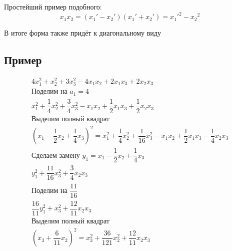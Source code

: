 \documentclass[12pt]{article}
\begin{document}
Простейший пример подобного:
\[
    x_1x_2 = (x_1' - x_2')(x_1' + x_2') = {x_1'}^2 - {x_2}^2
\]

В итоге форма также придёт к диагональному виду

\subsection{Пример}
\[
    \begin{array}{l}
        4x_1^2 + x_2^2 + 3x_3^2 - 4x_1x_2 + 2x_1x_3 + 2x_2x_3                                                                                           \\
        \text{Поделим на } a_1 = 4                                                                                                                      \\
        x_1^2 + \dfrac{1}{4}x_2^2 + \dfrac{3}{4}x_3^2 - x_1x_2 + \dfrac{1}{2}x_1x_3 + \dfrac{1}{2}x_2x_3                                                \\
        \text{Выделим полный квадрат}                                                                                                                   \\
        (x_1 - \dfrac{1}{2}x_2 + \dfrac{1}{4}x_3)^2 = x_1^2 + \dfrac{1}{4}x_2^2 + \dfrac{1}{16}x_3^2 - x_1x_2 + \dfrac{1}{2}x_1x_3 - \dfrac{1}{4}x_2x_3 \\
        \text{Сделаем замену } y_1 = x_1 - \dfrac{1}{2}x_2 + \dfrac{1}{4}x_3                                                                            \\
        y_1^2 + \dfrac{11}{16}x_3^2 + \dfrac{3}{4}x_2x_3                                                                                                \\
        \text{Поделим на } \dfrac{11}{16}                                                                                                               \\
        \dfrac{16}{11}y_1^2 + x_3^2 + \dfrac{12}{11}x_2x_3                                                                                              \\
        \text{Выделим полный квадрат}                                                                                                                   \\
        (x_3 + \dfrac{6}{11}x_2)^2 = x_3^2 + \dfrac{36}{121}x_2^2 + \dfrac{12}{11}x_2x_3                                                                \\

\end{array}\]
\end{document}
